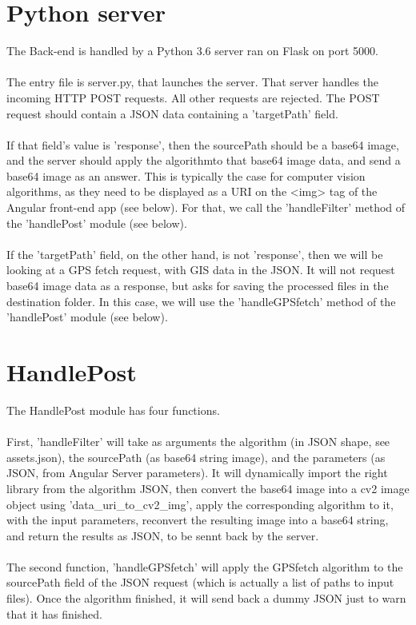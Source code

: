 \documentclass[12pt,a4paper]{article}
\begin{document}
\section{Python server}
The Back-end is handled by a Python 3.6 server ran on Flask on port 5000.\\
~\\
The entry file is server.py, that launches the server. That server handles the incoming HTTP POST requests. All other requests are rejected. The POST request should contain a JSON data containing a 'targetPath' field.\\
~\\
If that field's value is 'response', then the sourcePath should be a base64 image, and the server should apply the algorithmto that base64 image data, and send a base64 image as an answer. This is typically the case for computer vision algorithms, as they need to be displayed as a URI on the <img> tag of the Angular front-end app (see below). For that, we call the 'handleFilter' method of the 'handlePost' module (see below).\\
~\\
If the 'targetPath' field, on the other hand, is not 'response', then we will be looking at a GPS fetch request, with GIS data in the JSON. It will not request base64 image data as a response, but asks for saving the processed files in the destination folder. In this case, we will use the 'handleGPSfetch' method of the 'handlePost' module (see below).

\section{HandlePost}
The HandlePost module has four functions.\\
~\\
First, 'handleFilter' will take as arguments the algorithm (in JSON shape, see assets.json), the sourcePath (as base64 string image), and the parameters (as JSON, from Angular Server parameters). It will dynamically import the right library from the algorithm JSON, then convert the base64 image into a cv2 image object using 'data\_uri\_to\_cv2\_img', apply the corresponding algorithm to it, with the input parameters, reconvert the resulting image into a base64 string, and return the results as JSON, to be sennt back by the server.\\
~\\
The second function, 'handleGPSfetch' will apply the GPSfetch algorithm to the sourcePath field of the JSON request (which is actually a list of paths to input files). Once the algorithm finished, it will send back a dummy JSON just to warn that it has finished.
\end{document}
